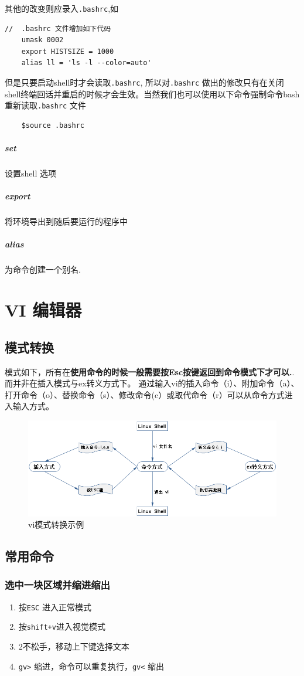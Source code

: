 \documentclass[UTF8,a4paper,12pt]{ctexbook}
\begin{document}
			其他的改变则应录入\verb|.bashrc|,如
			\begin{lstlisting}
//  .bashrc 文件增加如下代码
	umask 0002
	export HISTSIZE = 1000
	alias ll = 'ls -l --color=auto'
			\end{lstlisting}
			
			但是只要启动shell时才会读取\verb|.bashrc|, 所以对\verb|.bashrc| 做出的修改只有在关闭shell终端回话并重启的时候才会生效。当然我们也可以使用以下命令强制命令bash 重新读取\verb|.bashrc| 文件
			
			\begin{lstlisting}
	$source .bashrc
			\end{lstlisting}
		\subparagraph{set}设置shell 选项
		\subparagraph{export}将环境导出到随后要运行的程序中
		\subparagraph{alias}为命令创建一个别名.
		
	\section{VI 编辑器}
		\subsection{模式转换}
			模式如下，所有在\textbf{使用命令的时候一般需要按Esc按键返回到命令模式下才可以.}.而并非在插入模式与ex转义方式下。
			通过输入vi的插入命令（i）、附加命令（a）、打开命令（o）、替换命令（s）、修改命令(c）或取代命令（r）可以从命令方式进入输入方式。
			\begin{figure}[h]
				\centering
				\includegraphics[scale = 0.5]{vi.png}
				\caption{vi模式转换示例}
			\end{figure}
		
		\subsection{常用命令}
			\subsubsection{选中一块区域并缩进缩出}
				\begin{enumerate}
					\item 按\verb|ESC| 进入正常模式
					\item 按\verb|shift+v|进入视觉模式
					\item 2不松手，移动上下键选择文本
					\item \verb|gv>| 缩进，命令可以重复执行，\verb|gv<| 缩出
				\end{enumerate}
\end{document}
